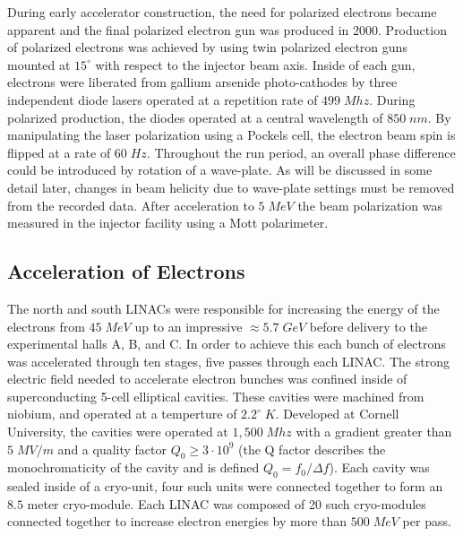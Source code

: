 During early accelerator construction, the need for polarized electrons became apparent and the final polarized electron gun was produced in 2000.  Production of polarized electrons was achieved by using twin polarized electron guns mounted at $15^\circ$ with respect to the injector beam axis.  Inside of each gun, electrons were liberated from gallium arsenide photo-cathodes by three independent diode lasers operated at a repetition rate of $499 \; Mhz$.  During polarized production, the diodes operated at a central wavelength of $850 \; nm$.  By manipulating the laser polarization using a Pockels cell, the electron  beam spin is flipped at a rate of $60 \; Hz$.  Throughout the run period, an overall phase difference could be introduced by rotation of a wave-plate.  As will be discussed in some detail later, changes in beam helicity due to wave-plate settings must be removed from the recorded data.  After acceleration to $5 \; MeV$ the beam polarization was measured in the injector facility using a Mott polarimeter. \\


\subsection{Acceleration of Electrons}    
The north and south LINACs were responsible for increasing the energy of the electrons from $45 \; MeV$ up to an impressive $\approx 5.7 \; GeV$ before delivery to the experimental halls A, B, and C.  In order to achieve this each bunch of electrons was accelerated through ten stages, five passes through each LINAC.  The strong electric field needed to accelerate electron bunches was confined inside of superconducting 5-cell elliptical cavities.  These cavities were machined from niobium, and operated at a temperture of $2.2^\circ \; K$.  Developed at Cornell University, the cavities were operated at $1,500 \; Mhz$ with a gradient greater than $5 \; MV/m$ and a quality factor $Q_0 \geq 3 \cdot 10^9$ (the Q factor describes the monochromaticity of the cavity and is defined $Q_0 = f_0/\Delta f$).  Each cavity was sealed inside of a cryo-unit, four such units were connected together to form an $8.5$ meter cryo-module.  Each LINAC was composed of 20 such cryo-modules connected together to increase electron energies by more than $500 \; MeV$ per pass.\\

